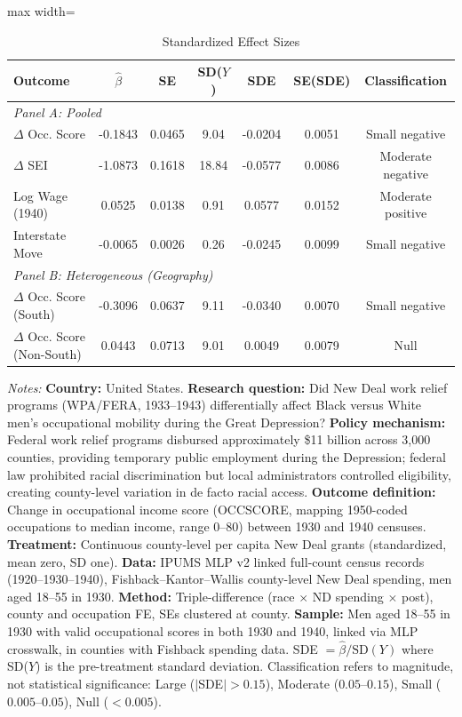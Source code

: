 \begin{table}[t]
\centering
\caption{Standardized Effect Sizes}
\label{tab:sde}
\begin{adjustbox}{max width=\textwidth}
\begin{tabular}{lcccccc}
\toprule
Outcome & $\hat{\beta}$ & SE & SD($Y$) & SDE & SE(SDE) & Classification \\
\midrule
\multicolumn{7}{l}{\textit{Panel A: Pooled}} \\[4pt]
$\Delta$ Occ. Score & -0.1843 & 0.0465 & 9.04 & -0.0204 & 0.0051 & Small negative \\
$\Delta$ SEI & -1.0873 & 0.1618 & 18.84 & -0.0577 & 0.0086 & Moderate negative \\
Log Wage (1940) & 0.0525 & 0.0138 & 0.91 & 0.0577 & 0.0152 & Moderate positive \\
Interstate Move & -0.0065 & 0.0026 & 0.26 & -0.0245 & 0.0099 & Small negative \\
\midrule
\multicolumn{7}{l}{\textit{Panel B: Heterogeneous (Geography)}} \\[4pt]
$\Delta$ Occ. Score (South) & -0.3096 & 0.0637 & 9.11 & -0.0340 & 0.0070 & Small negative \\
$\Delta$ Occ. Score (Non-South) & 0.0443 & 0.0713 & 9.01 & 0.0049 & 0.0079 & Null \\
\bottomrule
\end{tabular}
\end{adjustbox}
\begin{tablenotes}
\item \textit{Notes:} \textbf{Country:} United States. \textbf{Research question:} Did New Deal work relief programs (WPA/FERA, 1933--1943) differentially affect Black versus White men's occupational mobility during the Great Depression? \textbf{Policy mechanism:} Federal work relief programs disbursed approximately \$11 billion across 3,000 counties, providing temporary public employment during the Depression; federal law prohibited racial discrimination but local administrators controlled eligibility, creating county-level variation in de facto racial access. \textbf{Outcome definition:} Change in occupational income score (OCCSCORE, mapping 1950-coded occupations to median income, range 0--80) between 1930 and 1940 censuses. \textbf{Treatment:} Continuous county-level per capita New Deal grants (standardized, mean zero, SD one). \textbf{Data:} IPUMS MLP v2 linked full-count census records (1920--1930--1940), Fishback--Kantor--Wallis county-level New Deal spending, men aged 18--55 in 1930. \textbf{Method:} Triple-difference (race $\times$ ND spending $\times$ post), county and occupation FE, SEs clustered at county. \textbf{Sample:} Men aged 18--55 in 1930 with valid occupational scores in both 1930 and 1940, linked via MLP crosswalk, in counties with Fishback spending data. SDE $= \hat{\beta} / \text{SD}(Y)$ where SD($Y$) is the pre-treatment standard deviation. Classification refers to magnitude, not statistical significance: Large ($|$SDE$| > 0.15$), Moderate ($0.05$--$0.15$), Small ($0.005$--$0.05$), Null ($< 0.005$).
\end{tablenotes}
\end{table}
